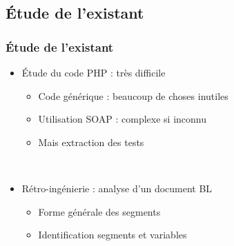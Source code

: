 \subsection{\'Etude de l'existant}

\begin{frame}
	\frametitle{\'Etude de l'existant}
	
	\begin{itemize}
		\item \'Etude du code PHP : très difficile
			\begin{itemize}
				\item Code générique : beaucoup de choses \og inutiles \fg
				\item Utilisation SOAP : complexe si inconnu\sautligne
				
				\item Mais extraction des tests
			\end{itemize}~
			
		\item Rétro-ingénierie : analyse d'un document BL
			\begin{itemize}			
				\item Forme générale des segments
				\item Identification segments et variables
			\end{itemize}~
	\end{itemize}
\end{frame}
